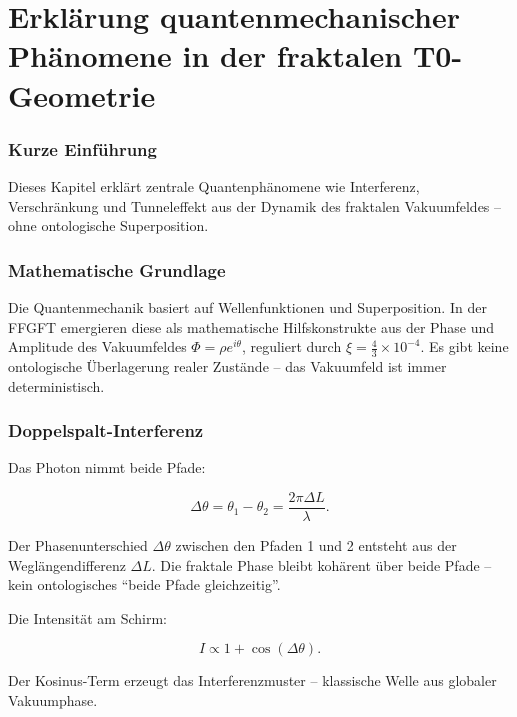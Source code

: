 \chapter{Erklärung quantenmechanischer Phänomene in der fraktalen T0-Geometrie}


	
	\subsection*{Kurze Einführung}
	
	Dieses Kapitel erklärt zentrale Quantenphänomene wie Interferenz, Verschränkung und Tunneleffekt aus der Dynamik des fraktalen Vakuumfeldes – ohne ontologische Superposition.
	
	\subsection*{Mathematische Grundlage}
	
	Die Quantenmechanik basiert auf Wellenfunktionen und Superposition. In der FFGFT emergieren diese als mathematische Hilfskonstrukte aus der Phase und Amplitude des Vakuumfeldes \(\Phi = \rho e^{i\theta}\), reguliert durch \(\xi = \frac{4}{3} \times 10^{-4}\). Es gibt keine ontologische Überlagerung realer Zustände – das Vakuumfeld ist immer deterministisch.
	
	\subsection*{Doppelspalt-Interferenz}
	
	Das Photon nimmt beide Pfade:
	
	\begin{equation}
		\Delta \theta = \theta_1 - \theta_2 = \frac{2\pi \Delta L}{\lambda}.
	\end{equation}
	
	Der Phasenunterschied \(\Delta \theta\) zwischen den Pfaden 1 und 2 entsteht aus der Weglängendifferenz \(\Delta L\). Die fraktale Phase bleibt kohärent über beide Pfade – kein ontologisches \enquote{beide Pfade gleichzeitig}.
	
	Die Intensität am Schirm:
	
	\begin{equation}
		I \propto 1 + \cos(\Delta \theta).
	\end{equation}
	
	Der Kosinus-Term erzeugt das Interferenzmuster – klassische Welle aus globaler Vakuumphase.
	
